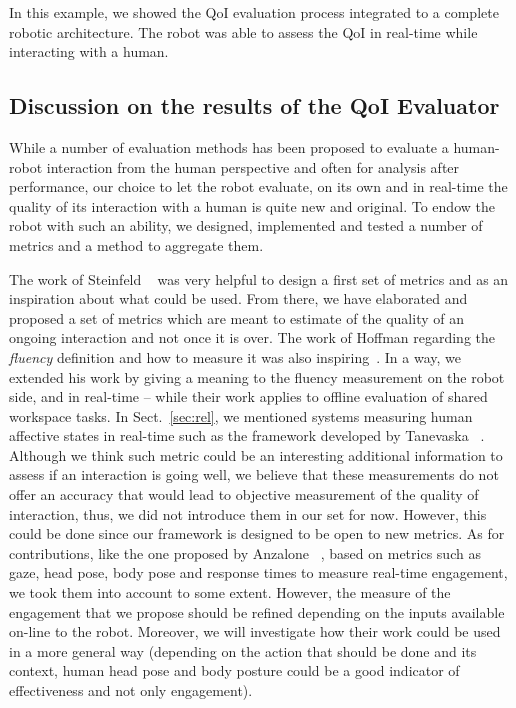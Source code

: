 \documentclass[a4paper,11pt,twoside]{StyleThese}
\begin{document}
In this example, we showed the QoI evaluation process integrated to a complete robotic architecture. The robot was able to assess the QoI in real-time while interacting with a human.

\subsection{Discussion on the results of the QoI Evaluator}
While a number of evaluation methods has been proposed to evaluate a human-robot interaction from the human perspective and often for analysis after performance, our choice to let the robot evaluate, on its own and in real-time the quality of its interaction with a human is quite new and original. To endow the robot with such an ability, we designed, implemented and tested a number of metrics and a method to aggregate them.

The work of Steinfeld \etal{}~\cite{steinfeld_2006_common} was very helpful to design a first set of metrics and as an inspiration about what could be used. From there, we have elaborated and proposed a set of metrics which are meant to estimate of the quality of an ongoing interaction and not once it is over. 
The work of Hoffman regarding the \emph{fluency} definition and how to measure it was also inspiring~\cite{hoffman2019}. In a way, we extended his work by giving a meaning to the fluency measurement on the robot side, and in real-time -- while their work applies to offline evaluation of shared workspace tasks. 
In Sect.~\ref{sec:rel}, we mentioned systems measuring human affective states in real-time such as the framework developed by Tanevaska \etal{}~\cite{tanevska:hal-01615491}. Although we think such metric could be an interesting additional information to assess if an interaction is going well, we believe that these measurements do not offer an accuracy that would lead to objective measurement of the quality of interaction, thus, we did not introduce them in our set for now. However, this could be done since our framework is designed to be open to new metrics. 
As for contributions, like the one proposed by Anzalone \etal{}~\cite{anzalone_2015_evaluating}, based on metrics such as gaze, head pose, body pose and response times to measure real-time engagement, we took them into account to some extent. However, the measure of the engagement that we propose should be refined depending on the inputs available on-line to the robot. Moreover, we will investigate how their work could be used in a more general way (\eg depending on the action that should be done and its context, human head pose and body posture could be a good indicator of effectiveness and not only engagement). 
\end{document}
